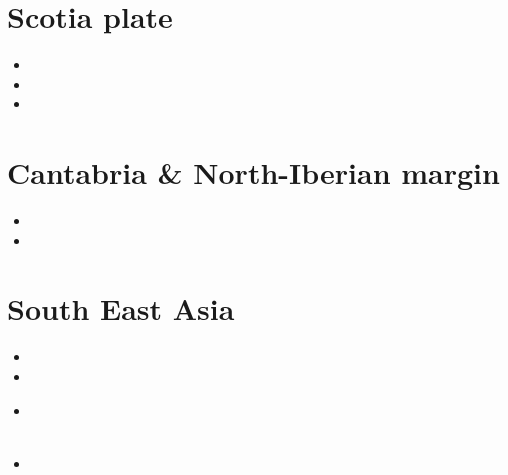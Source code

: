\section{Scotia plate}

\begin{scriptsize}
\begin{itemize}
\item[\twothousandthirteen]
\item[\twothousandtwenty]
\item[\twothousandtwentyone]
\end{itemize}
\end{scriptsize}

\section{Cantabria \& North-Iberian margin}

\begin{scriptsize}
\begin{itemize}
\item[\twothousandtwo]
\item[\twothousandfifteen]
\end{itemize}
\end{scriptsize}

\section{South East Asia}

\begin{scriptsize}
\begin{itemize}
\item[\twothousand]
\item[\twothousandfour]
\item[\twothousandfifteen]
 \\
 \\
\item[\twothousandsixteen]
\end{itemize}
\end{scriptsize}

